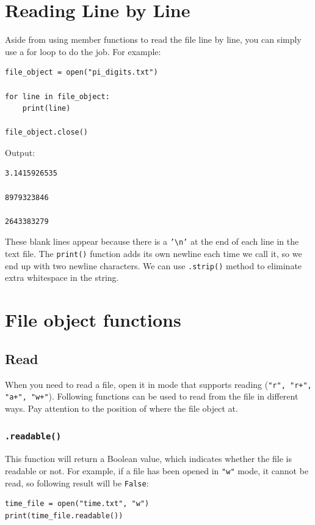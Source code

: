 \documentclass[12pt]{book}
\begin{document}
\section{Reading Line by Line}
\label{sec:org4c20621}
Aside from using member functions to read the file line by line, you can simply use a for loop to do the job. For example:
\begin{verbatim}
file_object = open("pi_digits.txt")

for line in file_object:
    print(line)

file_object.close()
\end{verbatim}
Output:
\begin{verbatim}
3.1415926535

8979323846

2643383279

\end{verbatim}
These blank lines appear because there is a \texttt{'\textbackslash{}n'} at the end of each line in the text file. The \texttt{print()} function adds its own newline each time we call it, so we end up with two newline characters. We can use \texttt{.strip()} method to eliminate extra whitespace in the string.

\section{File object functions}
\label{sec:org9754e25}
\subsection{Read}
\label{sec:orge7b0d1f}
When you need to read a file, open it in mode that supports reading (\texttt{"r", "r+", "a+", "w+"}). Following functions can be used to read from the file in different ways. Pay attention to the position of where the file object at.
\subsubsection{\texttt{.readable()}}
\label{sec:orged009f3}
This function will return a Boolean value, which indicates whether the file is readable or not. For example, if a file has been opened in \texttt{"w"} mode, it cannot be read, so following result will be \texttt{False}:
\begin{verbatim}
time_file = open("time.txt", "w")
print(time_file.readable())
\end{verbatim}
\end{document}
